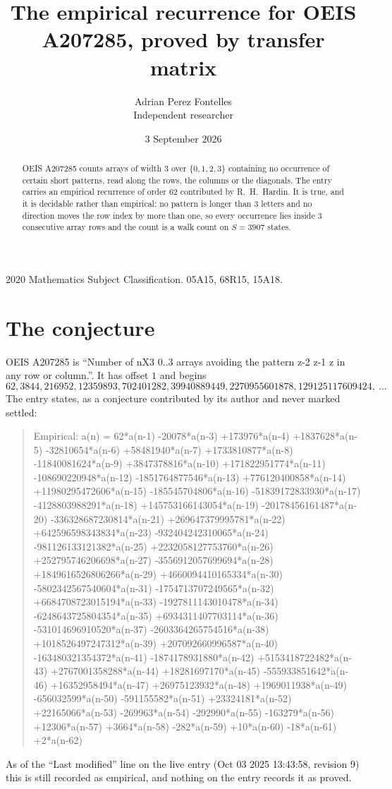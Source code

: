 \documentclass[11pt,a4paper]{article}
\title{The empirical recurrence for OEIS A207285, proved by transfer matrix}
\author{Adrian Perez Fontelles\\ \small Independent researcher}
\date{3 September 2026}
\theoremstyle{plain}
\theoremstyle{definition}
\begin{document}
\maketitle

\begin{abstract}
OEIS A207285 counts arrays of width $3$ over $\{0,1,2,3\}$ containing no occurrence of certain short
patterns, read along the rows, the columns or the diagonals. The entry carries an empirical
recurrence of order $62$ contributed by R.~H.~Hardin. It is true, and it is decidable
rather than empirical: no pattern is longer than $3$ letters and no direction moves the row
index by more than one, so every occurrence lies inside $3$ consecutive array rows and the
count is a walk count on $S=3907$ states.
\end{abstract}

\noindent\small 2020 Mathematics Subject Classification. 05A15, 68R15, 15A18.\normalsize

\section{The conjecture}

OEIS A207285 is ``Number of nX3 0..3 arrays avoiding the pattern z-2 z-1 z in any row or column.''. It has offset $1$ and begins
\[
62, 3844, 216952, 12359893, 702401282, 39940889449, 2270955601878, 129125117609424,\ \dots
\]
The entry states, as a conjecture contributed by its author and never marked settled:
\begin{quote}
Empirical: a(n) = 62*a(n-1) -20078*a(n-3) +173976*a(n-4) +1837628*a(n-5) -32810654*a(n-6) +58481940*a(n-7) +1733810877*a(n-8) -11840081624*a(n-9) +3847378816*a(n-10) +171822951774*a(n-11) -108690220948*a(n-12) -1851764877546*a(n-13) +776120400858*a(n-14) +11980295472606*a(n-15) -185545704806*a(n-16) -51839172833930*a(n-17) -4128803988291*a(n-18) +145753166143054*a(n-19) -20178456161487*a(n-20) -336328687230814*a(n-21) +269647379995781*a(n-22) +642596598343834*a(n-23) -932404242310065*a(n-24) -981126133121382*a(n-25) +2232058127753760*a(n-26) +252795746206698*a(n-27) -3556912057699694*a(n-28) +1849616526806266*a(n-29) +4660094410165334*a(n-30) -5802342567540604*a(n-31) -1754713707249565*a(n-32) +6684708723015194*a(n-33) -1927811143010478*a(n-34) -6248643725804354*a(n-35) +6934311407703114*a(n-36) -531014696910520*a(n-37) -2603364265754516*a(n-38) +1018526497247312*a(n-39) +207092660996587*a(n-40) -163480321354372*a(n-41) -1874178931880*a(n-42) +5153418722482*a(n-43) +2767001358288*a(n-44) +18281697170*a(n-45) -555933851642*a(n-46) +16352958494*a(n-47) +26975123932*a(n-48) +1969011938*a(n-49) -656032599*a(n-50) -591155582*a(n-51) +23324181*a(n-52) +22165066*a(n-53) -269963*a(n-54) -292990*a(n-55) -163279*a(n-56) +12306*a(n-57) +3664*a(n-58) -282*a(n-59) +10*a(n-60) -18*a(n-61) +2*a(n-62)
\end{quote}
As of the ``Last modified'' line on the live entry (Oct 03 2025 13:43:58, revision 9) this is still
recorded as empirical, and nothing on the entry records it as proved.
\end{document}
